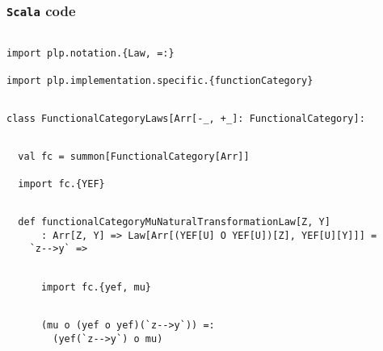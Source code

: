 \documentclass[11pt]{article}
\newcommand{\code}{\subsubsection{{\tt Scala} code}\begingroup\rm \vspace{12pt}}
\begin{document}
\code
\begin{mdframed}[backgroundcolor=lightgray!20] 
\begin{lstlisting}

import plp.notation.{Law, =:}

import plp.implementation.specific.{functionCategory}
\end{lstlisting}
\end{mdframed}
\vspace{6pt}
\begin{mdframed}[backgroundcolor=lightgray!20] 
\begin{lstlisting}

class FunctionalCategoryLaws[Arr[-_, +_]: FunctionalCategory]:
\end{lstlisting}
\end{mdframed}
\vspace{6pt}
\begin{mdframed}[backgroundcolor=lightgray!20] 
\begin{lstlisting}

  val fc = summon[FunctionalCategory[Arr]]

  import fc.{YEF}
\end{lstlisting}
\end{mdframed}
\vspace{6pt}
\begin{mdframed}[backgroundcolor=lightgray!20] 
\begin{lstlisting} 

  def functionalCategoryMuNaturalTransformationLaw[Z, Y]
      : Arr[Z, Y] => Law[Arr[(YEF[U] O YEF[U])[Z], YEF[U][Y]]] =
    `z-->y` =>
\end{lstlisting}
\end{mdframed}
\vspace{6pt}
\begin{mdframed}[backgroundcolor=lightgray!20] 
\begin{lstlisting}

      import fc.{yef, mu}
\end{lstlisting}
\end{mdframed}
\vspace{6pt}
\begin{mdframed}[backgroundcolor=lightgray!20] 
\begin{lstlisting}

      (mu o (yef o yef)(`z-->y`)) =:
        (yef(`z-->y`) o mu)
\end{lstlisting}
\end{mdframed}
\vspace{6pt}
\end{document}
